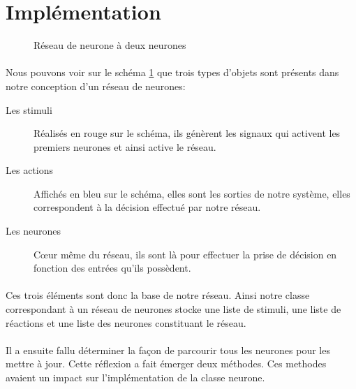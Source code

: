 \section{Implémentation}

\begin{figure}[ht]
  \centering
  
  \caption{Réseau de neurone à deux neurones}
  \label{graphInit}
\end{figure}

\paragraph{}
Nous pouvons voir sur le schéma \ref{graphInit} que trois types d'objets sont
présents dans notre conception d'un réseau de neurones:\\
\begin{description}
  \item[Les stimuli] Réalisés en rouge sur le schéma, ils génèrent les signaux
    qui activent les premiers neurones et ainsi active le réseau.
  \item[Les actions] Affichés en bleu sur le schéma, elles sont les sorties de
    notre système, elles correspondent à la décision effectué par notre réseau.
  \item[Les neurones] Cœur même du réseau, ils sont là pour effectuer la prise
    de décision en fonction des entrées qu'ils possèdent.
\end{description}

\paragraph{}
Ces trois éléments sont donc la base de notre réseau. Ainsi notre classe correspondant
à un réseau de neurones stocke une liste de stimuli, une liste de réactions et une
liste des neurones constituant le réseau.

\paragraph{}
Il a ensuite fallu déterminer la façon de parcourir tous les neurones pour les
mettre à jour. Cette réflexion a fait émerger deux méthodes. Ces methodes
avaient un impact sur l'implémentation de la classe neurone.\\

